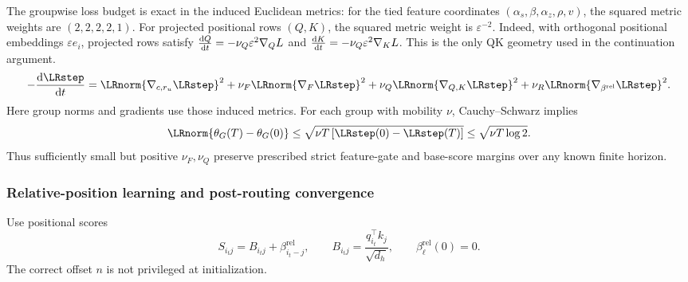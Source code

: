 The groupwise loss budget is exact in the induced Euclidean metrics:
for the tied feature coordinates $(\alpha_s,\beta,\alpha_z,\rho,v)$, the squared
metric weights are $(2,2,2,2,1)$. For projected positional rows $(Q,K)$,
the squared metric weight is $\varepsilon^{-2}$.
Indeed, with orthogonal positional embeddings $\varepsilon e_i$,
projected rows satisfy $\ddt{Q}=-\nu_Q\varepsilon^2\nabla_Q L$ and
$\ddt{K}=-\nu_Q\varepsilon^2\nabla_K L$. This is the only QK geometry
used in the continuation argument.
\begin{equation}\label{eq:lr-mobility-budget}
 -\ddt{\LRstep}=
 \LRnorm{\nabla_{c,r_u}\LRstep}^2
 +\nu_F\LRnorm{\nabla_F\LRstep}^2
 +\nu_Q\LRnorm{\nabla_{Q,K}\LRstep}^2
 +\nu_R\LRnorm{\nabla_{\beta^{\mathrm{rel}}}\LRstep}^2.
\end{equation}
Here group norms and gradients use those induced metrics. For each group
with mobility $\nu$, Cauchy--Schwarz implies
\begin{equation}\label{eq:lr-movement-budget}
 \LRnorm{\theta_G(T)-\theta_G(0)}
 \le\sqrt{\nu T\,[\LRstep(0)-\LRstep(T)]}
 \le\sqrt{\nu T\log2}.
\end{equation}
Thus sufficiently small but positive $\nu_F,\nu_Q$ preserve prescribed
strict feature-gate and base-score margins over any known finite horizon.


\subsubsection{Relative-position learning and post-routing convergence}
\label{app:weak-routing-convergence}

Use positional scores
\begin{equation}\label{eq:lr-relative-scores}
 S_{i_tj}=B_{i_tj}+\beta_{i_t-j}^{\mathrm{rel}},
 \qquad
 B_{i_tj}=\frac{q_{i_t}^\top k_j}{\sqrt{d_h}},
 \qquad \beta_\ell^{\mathrm{rel}}(0)=0.
\end{equation}
The correct offset $n$ is not privileged at initialization.

